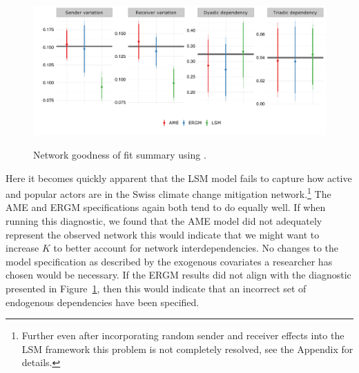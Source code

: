 \begin{figure}[ht]
	\centering
	\caption{Network goodness of fit summary using .}
	\includegraphics[width=1\textwidth]{netPerfCoef}
	\label{fig:ergmAmePerf}
\end{figure}
\FloatBarrier

Here it becomes quickly apparent that the LSM model fails to capture how active and popular actors are in the Swiss climate change mitigation network.\footnote{Further even after incorporating random sender and receiver effects into the LSM framework this problem is not completely resolved, see the Appendix for details.} The AME and ERGM specifications again both tend to do equally well. If when running this diagnostic, we found that the AME model did not adequately represent the observed network this would indicate that we might want to increase $K$ to better account for network interdependencies. No changes to the model specification as described by the exogenous covariates a researcher has chosen would be necessary. If the ERGM results did not align with the diagnostic presented in Figure~\ref{fig:ergmAmePerf}, then this would indicate that an incorrect set of endogenous dependencies have been specified. 
